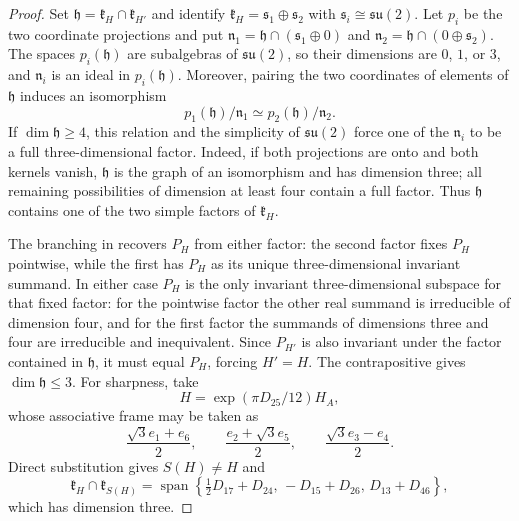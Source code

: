 \documentclass[11pt,a4paper]{article}
\newcommand{\Span}{\operatorname{span}}
\begin{document}
\begin{proof}
Set $\mathfrak h=\mathfrak k_H\cap\mathfrak k_{H'}$ and identify $\mathfrak k_H=\mathfrak s_1\oplus\mathfrak s_2$ with $\mathfrak s_i\cong\mathfrak{su}(2)$.  Let $p_i$ be the two coordinate projections and put $\mathfrak n_1=\mathfrak h\cap(\mathfrak s_1\oplus0)$ and $\mathfrak n_2=\mathfrak h\cap(0\oplus\mathfrak s_2)$.  The spaces $p_i(\mathfrak h)$ are subalgebras of $\mathfrak{su}(2)$, so their dimensions are $0$, $1$, or $3$, and $\mathfrak n_i$ is an ideal in $p_i(\mathfrak h)$.  Moreover, pairing the two coordinates of elements of $\mathfrak h$ induces an isomorphism
\[
p_1(\mathfrak h)/\mathfrak n_1\simeq p_2(\mathfrak h)/\mathfrak n_2.
\]
If $\dim\mathfrak h\ge4$, this relation and the simplicity of $\mathfrak{su}(2)$ force one of the $\mathfrak n_i$ to be a full three-dimensional factor.  Indeed, if both projections are onto and both kernels vanish, $\mathfrak h$ is the graph of an isomorphism and has dimension three; all remaining possibilities of dimension at least four contain a full factor.  Thus $\mathfrak h$ contains one of the two simple factors of $\mathfrak k_H$.

The branching in  recovers $P_H$ from either factor: the second factor fixes $P_H$ pointwise, while the first has $P_H$ as its unique three-dimensional invariant summand.  In either case $P_H$ is the only invariant three-dimensional subspace for that fixed factor: for the pointwise factor the other real summand is irreducible of dimension four, and for the first factor the summands of dimensions three and four are irreducible and inequivalent.  Since $P_{H'}$ is also invariant under the factor contained in $\mathfrak h$, it must equal $P_H$, forcing $H'=H$.  The contrapositive gives $\dim\mathfrak h\le3$.  For sharpness, take
\[
H=\exp(\pi D_{25}/12)H_A,
\]
whose associative frame may be taken as
\[
\frac{\sqrt3e_1+e_6}{2},\qquad
\frac{e_2+\sqrt3e_5}{2},\qquad
\frac{\sqrt3e_3-e_4}{2}.
\]
Direct substitution gives $S(H)\ne H$ and
\[
\mathfrak k_H\cap\mathfrak k_{S(H)}
=\Span\left\{
\tfrac12D_{17}+D_{24},\,-D_{15}+D_{26},\,D_{13}+D_{46}
\right\},
\]
which has dimension three.
\end{proof}
\end{document}
